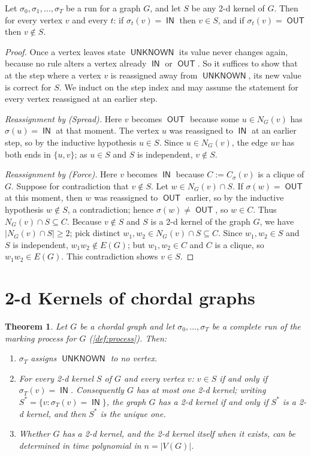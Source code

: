 \documentclass[11pt]{article}
\numberwithin{equation}{section}
\theoremstyle{plain}
\newtheorem{theorem}{Theorem}[section]
\newcommand{\V}{V}
\newcommand{\st}{\sigma}                   %
\DeclareMathOperator{\IN}{\mathsf{IN}}
\DeclareMathOperator{\OUT}{\mathsf{OUT}}
\DeclareMathOperator{\UNK}{\mathsf{UNKNOWN}}
\begin{document}
\begin{lemma}[Soundness]\label{lem:sound}
Let $\st_0,\st_1,\dots,\st_T$ be a run for a graph $G$, and let $S$ be any 2-d kernel of
$G$. Then for every vertex $v$ and every $t$: if $\st_t(v)=\IN$ then $v\in S$, and if
$\st_t(v)=\OUT$ then $v\notin S$.
\end{lemma}

\begin{proof}
Once a vertex leaves state $\UNK$ its value never changes again, because no rule alters a
vertex already $\IN$ or $\OUT$. So it suffices to show that at the step where a vertex
$v$ is reassigned away from $\UNK$, its new value is correct for $S$. We induct on the
step index and may assume the statement for every vertex reassigned at an earlier step.

\emph{Reassignment by (Spread).} Here $v$ becomes $\OUT$ because some $u\in N_G(v)$ has
$\st(u)=\IN$ at that moment. The vertex $u$ was reassigned to $\IN$ at an earlier step,
so by the inductive hypothesis $u\in S$. Since $u\in N_G(v)$, the edge $uv$ has both ends
in $\{u,v\}$; as $u\in S$ and $S$ is independent, $v\notin S$.

\emph{Reassignment by (Force).} Here $v$ becomes $\IN$ because $C:=C_\st(v)$ is a clique
of $G$. Suppose for contradiction that $v\notin S$. Let $w\in N_G(v)\cap S$. If
$\st(w)=\OUT$ at this moment, then $w$ was reassigned to $\OUT$ earlier, so by the
inductive hypothesis $w\notin S$, a contradiction; hence $\st(w)\neq\OUT$, so $w\in C$.
Thus $N_G(v)\cap S\subseteq C$. Because $v\notin S$ and $S$ is a 2-d kernel of the graph
$G$, we have $|N_G(v)\cap S|\ge 2$; pick distinct $w_1,w_2\in N_G(v)\cap S\subseteq C$.
Since $w_1,w_2\in S$ and $S$ is independent, $w_1w_2\notin E(G)$; but $w_1,w_2\in C$ and
$C$ is a clique, so $w_1w_2\in E(G)$. This contradiction shows $v\in S$.
\end{proof}

\section{2-d Kernels of chordal graphs}
\label{sec:chordal}

\begin{theorem}\label{thm:chordal}
Let $G$ be a chordal graph and let $\st_0,\dots,\st_T$ be a complete run of the marking
process for $G$ (\cref{def:process}). Then:
\begin{enumerate}[label=\textup{(\arabic*)},leftmargin=2.6em]
\item $\st_T$ assigns $\UNK$ to no vertex.
\item For every 2-d kernel $S$ of $G$ and every vertex $v$: $v\in S$ if and only if
$\st_T(v)=\IN$. Consequently $G$ has at most one 2-d kernel; writing
$S^\ast=\{v:\st_T(v)=\IN\}$, the graph $G$ has a 2-d kernel if and only if $S^\ast$ is a
2-d kernel, and then $S^\ast$ is the unique one.
\item Whether $G$ has a 2-d kernel, and the 2-d kernel itself when it exists, can be
determined in time polynomial in $n=|\V(G)|$.
\end{enumerate}
\end{theorem}
\end{document}
